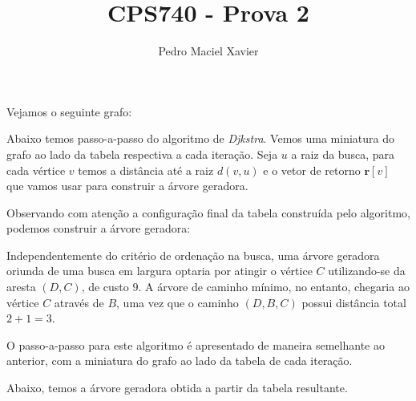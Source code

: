 \documentclass{homework}
\title{CPS740 - Prova 2}
\author{Pedro Maciel Xavier}
\begin{document}
	
	
	\quest Vejamos o seguinte grafo:
	
	\begin{fig}
		
	\end{fig}
	
	
	Abaixo temos passo-a-passo do algoritmo de \textit{Djkstra}. Vemos uma miniatura do grafo ao lado da tabela respectiva a cada iteração. Seja $u$ a raiz da busca, para cada vértice $v$ temos a distância até a raiz $d(v, u)$ e o vetor de retorno $\mathbf{r}[v]$ que vamos usar para construir a árvore geradora.
	
	
	
	\pagebreak
	
	
	Observando com atenção a configuração final da tabela construída pelo algoritmo, podemos construir a árvore geradora:
	
	
	
	
	Independentemente do critério de ordenação na busca, uma árvore geradora oriunda de uma busca em largura optaria por atingir o vértice $C$ utilizando-se da aresta $(D, C)$, de custo $9$. A árvore de caminho mínimo, no entanto, chegaria ao vértice $C$ através de $B$, uma vez que o caminho $(D, B, C)$ possui distância total $2 + 1 = 3$.
	
	
	O passo-a-passo para este algoritmo  é apresentado de maneira semelhante ao anterior, com a miniatura do grafo ao lado da tabela de cada iteração.
	
	
	
	\pagebreak
	
	
	Abaixo, temos a árvore geradora obtida a partir da tabela resultante.
	
\end{document}
